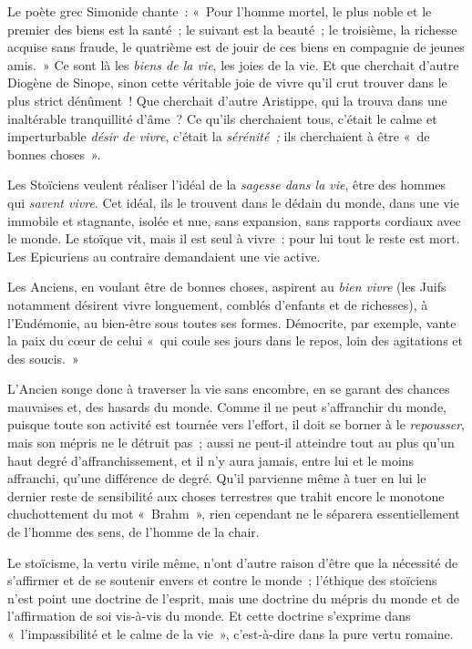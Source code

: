 \documentclass[french,twoside]{book} %
\begin{document}
Le poète grec Simonide chante : « Pour l’homme mortel, le plus noble et le premier des biens est la santé ; le suivant est la beauté ; le troisième, la richesse acquise sans fraude, le quatrième est de jouir de ces biens en compagnie de jeunes amis. » Ce sont là les \emph{biens de la vie}, les joies de la vie. Et que cherchait d’autre Diogène de Sinope, sinon cette véritable joie de vivre qu’il crut trouver dans le plus strict dénûment ! Que cherchait d’autre Aristippe, qui la trouva dans une inaltérable tranquillité d’âme ? Ce  qu’ils cherchaient tous, c’était le calme et imperturbable \emph{désir de vivre}, c’était la \emph{sérénité ;} ils cherchaient à être « de bonnes choses ».\par
Les Stoïciens veulent réaliser l’idéal de la \emph{sagesse dans la vie}, être des hommes qui \emph{savent vivre}. Cet idéal, ils le trouvent dans le dédain du monde, dans une vie immobile et stagnante, isolée et nue, sans expansion, sans rapports cordiaux avec le monde. Le stoïque vit, mais il est seul à vivre : pour lui tout le reste est mort. Les Epicuriens au contraire demandaient une vie active.\par
Les Anciens, en voulant être de bonnes choses, aspirent au \emph{bien vivre} (les Juifs notamment désirent vivre longuement, comblés d’enfants et de richesses), à l’Eudémonie, au bien-être sous toutes ses formes. Démocrite, par exemple, vante la paix du cœur de celui « qui coule ses jours dans le repos, loin des agitations et des soucis. »\par
L’Ancien songe donc à traverser la vie sans encombre, en se garant des chances mauvaises et, des hasards du monde. Comme il ne peut s’affranchir du monde, puisque toute son activité est tournée vers l’effort, il doit se borner à le \emph{repousser}, mais son mépris ne le détruit pas ; aussi ne peut-il atteindre tout au plus qu’un haut degré d’affranchissement, et il n’y aura jamais, entre lui et le moins affranchi, qu’une différence de degré. Qu’il parvienne même à tuer en lui le dernier reste de sensibilité aux choses terrestres que trahit encore le monotone chuchottement du mot « Brahm », rien cependant ne le séparera essentiellement de l’homme des sens, de l’homme de la chair.\par
Le stoïcisme, la vertu virile même, n’ont d’autre raison d’être que la nécessité de s’affirmer et de se soutenir envers et contre le monde ; l’éthique des stoïciens n’est point une doctrine de l’esprit, mais une doctrine du mépris du monde et de l’affirmation de soi vis-à-vis du monde. Et cette doctrine  s’exprime dans « l’impassibilité et le calme de la vie », c’est-à-dire dans la pure vertu romaine.\par
\end{document}
